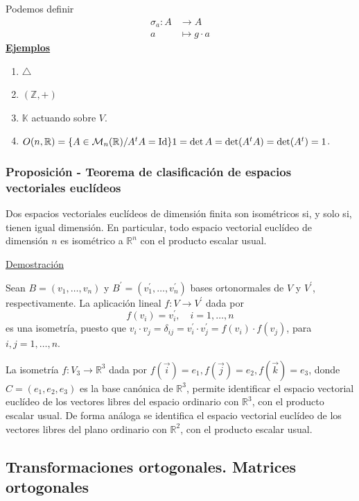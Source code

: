 \documentclass[12pt, a4paper, ones, notitlepage, openany,titlepage]{article}
\newcommand{\demostracion}{\noindent\underline{Demostración}}
\newcommand{\ejemplos}{\noindent\underline{\textbf{Ejemplos}}}
\begin{document}
Podemos definir
$$
\begin{aligned}
	\sigma_a : A & \longrightarrow A \\
	a & \longmapsto g \cdot a
\end{aligned}
$$
\ejemplos
\begin{enumerate}
	\item $\triangle$
	\item $(\mathbb{Z},+)$
	\item $\mathbb{K}$ actuando sobre $V$.
	\item $O(n, \mathbb{R}) = \{A \in \mathcal{M}_n (\mathbb{R}) /
	A^t A = \operatorname{Id}\} \\
	1 = \det A = \det(A^tA) = \det(A^t) = 1$.
\end{enumerate}

\subsubsection{Proposición - Teorema de clasificación de espacios vectoriales euclídeos}
Dos espacios vectoriales euclídeos de dimensión finita son isométricos si, y solo si, tienen igual dimensión. En particular, todo espacio vectorial euclídeo de dimensión $n$ es isométrico a $\mathbb{R}^{n}$ con el producto escalar usual.

\demostracion

Sean $B=\left(v_{1}, \ldots, v_{n}\right)$ y $B^{\prime}=\left(v_{1}^{\prime}, \ldots, v_{n}^{\prime}\right)$ bases ortonormales de $V$ y $V^{\prime}$, respectivamente. La aplicación lineal $f: V \rightarrow V^{\prime}$ dada por
$$
f\left(v_{i}\right)=v_{i}^{\prime}, \quad i=1, \ldots, n
$$
\noindent es una isometría, puesto que $v_{i} \cdot v_{j}=\delta_{i j}=v_{i}^{\prime} \cdot v_{j}^{\prime}=f\left(v_{i}\right) \cdot f\left(v_{j}\right)$, para $i, j=1, \ldots, n$.

La isometría $f: V_{3} \rightarrow \mathbb{R}^{3}$ dada por $f(\vec{i})=e_{1}, f(\vec{j})=e_{2}, f(\vec{k})=e_{3}$, donde $C=\left(e_{1}, e_{2}, e_{3}\right)$ es la base canónica de $\mathbb{R}^{3}$, permite identificar el espacio vectorial euclídeo de los vectores libres del espacio ordinario con $\mathbb{R}^{3}$, con el producto escalar usual. De forma análoga se identifica el espacio vectorial euclídeo de los vectores libres del plano ordinario con $\mathbb{R}^{2}$, con el producto escalar usual.

\subsection{Transformaciones ortogonales. Matrices ortogonales}
\end{document}
